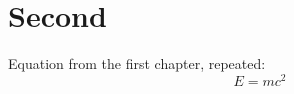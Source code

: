 \chapter{Second}\label{ch:two}
Equation from the first chapter, repeated:
\begin{equation}
  E = mc^2
\end{equation}

